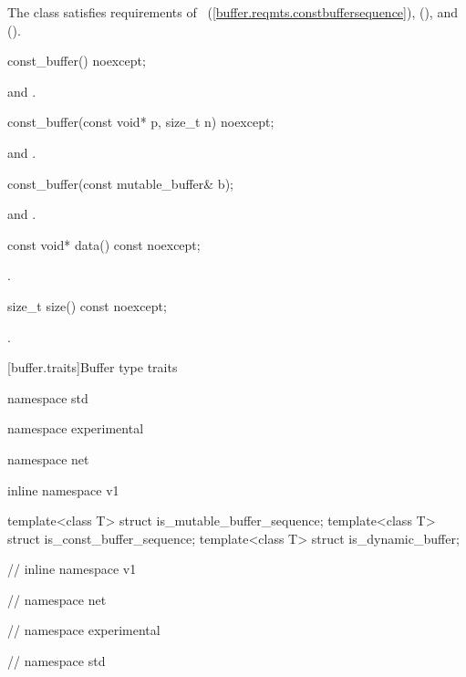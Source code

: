 \pnum
The  class satisfies requirements of ~(\ref{buffer.reqmts.constbuffersequence}),  (), and  ().

\begin{itemdecl}
const_buffer() noexcept;
\end{itemdecl}

\begin{itemdescr}
\pnum
\postconditions {} and .
\end{itemdescr}

\begin{itemdecl}
const_buffer(const void* p, size_t n) noexcept;
\end{itemdecl}

\begin{itemdescr}
\pnum
\postconditions {} and .
\end{itemdescr}

\begin{itemdecl}
const_buffer(const mutable_buffer& b);
\end{itemdecl}

\begin{itemdescr}
\pnum
\postconditions {} and .
\end{itemdescr}

\begin{itemdecl}
const void* data() const noexcept;
\end{itemdecl}

\begin{itemdescr}
\pnum
\returns {}.
\end{itemdescr}

\begin{itemdecl}
size_t size() const noexcept;
\end{itemdecl}

\begin{itemdescr}
\pnum
\returns {}.
\end{itemdescr}



[buffer.traits]{Buffer type traits}

\begin{codeblock}
namespace std {
namespace experimental {
namespace net {
inline namespace v1 {

  template<class T> struct is_mutable_buffer_sequence;
  template<class T> struct is_const_buffer_sequence;
  template<class T> struct is_dynamic_buffer;

} // inline namespace v1
} // namespace net
} // namespace experimental
} // namespace std
\end{codeblock}

